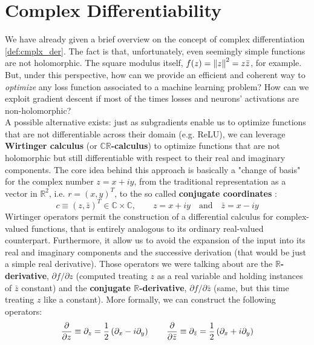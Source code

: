 \documentclass[../main.tex]{subfiles}
\begin{document}
\section{Complex Differentiability}
\label{sec:cmplx_differentiability}

We have already given a brief overview on the concept of complex differentiation \ref{def:cmplx_der}. The fact is that, unfortunately, even seemingly simple functions are not holomorphic. The square modulus itself, $f(z) = \norm{z}^2 = z\bar{z}$, for example.\\
But, under this perspective, how can we provide an efficient and coherent way to \textit{optimize} any loss function associated to a machine learning problem? How can we exploit gradient descent if most of the times losses and neurons' activations are non-holomorphic?\\
A possible alternative exists: just as subgradients enable us to optimize functions that are not differentiable across their domain (e.g. ReLU), we can leverage \textbf{Wirtinger calculus} (or \textbf{$\mathds{CR}$-calculus}) to optimize functions that are not holomorphic
but still differentiable with respect to their real and imaginary components. The core idea behind this approach is basically a "change of basis" for the complex number $z=x+iy$, from the traditional representation as a vector in $\mathds{R}^2$, i.e. $r=(x,y)^T$, to the so called \textbf{conjugate coordinates} \cite{kreutzdelgado2009complex}:
\begin{equation}
	c \equiv \left(z, \bar{z}\right)^T \in \mathds{C}\times\mathds{C}, \qquad z=x+iy \quad\text{and}\quad \bar{z}=x-iy
\end{equation}
Wirtinger operators permit the construction of a differential calculus for complex-valued functions, that is entirely analogous to its ordinary real-valued counterpart. Furthermore, it allow us to avoid the expansion of the input into its real and imaginary components and the successive derivation (that would be just a simple real derivative). Those operators we were talking about are the \textbf{$\mathds{R}$-derivative}, $\partial f/\partial z$ (computed treating $z$ as a real variable and holding instances of $\bar{z}$ constant) and the \textbf{conjugate $\mathds{R}$-derivative}, $\partial f/\partial\bar{z}$ (same, but this time treating $z$ like a constant). More formally, we can construct the following operators:
\begin{equation}
\pdv{}{z} \equiv \partial_z = \frac{1}{2}\left(\partial_x - i\partial_y\right) \qquad  \pdv{}{\bar{z}} \equiv \partial_{\bar{z}} = \frac{1}{2}\left(\partial_x + i\partial_y\right)
\label{eq:CR_derivs}
\end{equation}
\end{document}
